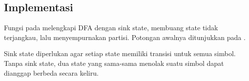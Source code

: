 \subsection{Implementasi}

Fungsi  pada  melengkapi DFA dengan
sink state, membuang state tidak terjangkau, lalu menyempurnakan
partisi. Potongan awalnya ditunjukkan pada .


Sink state diperlukan agar setiap state memiliki transisi untuk semua
simbol. Tanpa sink state, dua state yang sama-sama menolak suatu
simbol dapat dianggap berbeda secara keliru.
